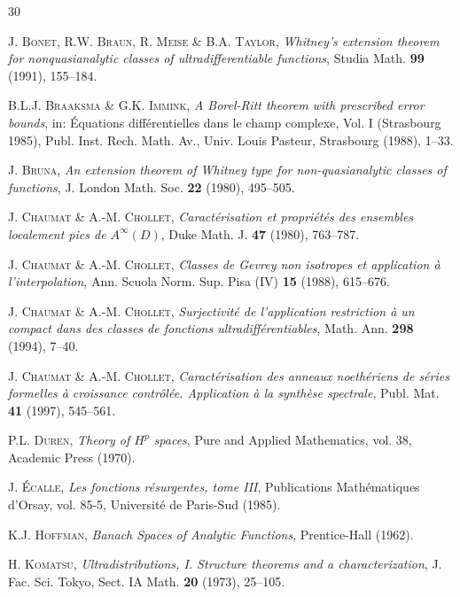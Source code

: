 \documentclass[a4paper]{amsart}
\theoremstyle{plain}
\theoremstyle{definition}
\theoremstyle{remark}
\begin{document}
\begin{thebibliography}{30}

 \textsc{J. Bonet, R.W. Braun, R. Meise \& B.A. Taylor}, \textit{Whitney's extension theorem for nonquasianalytic classes of ultradifferentiable functions}, Studia Math. \textbf{99} (1991), 155--184.

 \textsc{B.L.J. Braaksma \& G.K. Immink}, \textit{A Borel-Ritt theorem with prescribed error bounds}, in: \'Equations diff\'erentielles dans le champ complexe, Vol. I (Strasbourg 1985), Publ. Inst. Rech. Math. Av., Univ. Louis Pasteur, Strasbourg (1988), 1--33.

 \textsc{J. Bruna}, \textit{An extension theorem of Whitney type for non-quasianalytic classes of functions}, J. London Math. Soc. \textbf{22} (1980), 495--505.

 \textsc{J. Chaumat \& A.-M. Chollet}, \textit{Caract\'erisation et propri\'et\'es des ensembles localement pics de $ A^\infty(D) $}, Duke Math. J. \textbf{47} (1980), 763--787.

 \textsc{J. Chaumat \& A.-M. Chollet}, \textit{Classes de Gevrey non isotropes et application \`a l'interpolation}, Ann. Scuola Norm. Sup. Pisa (IV) \textbf{15} (1988), 615--676.

 \textsc{J. Chaumat \& A.-M. Chollet}, \textit{Surjectivit\'e de l'application restriction \`a un compact dans des classes de fonctions ultradiff\'erentiables}, Math. Ann. \textbf{298} (1994), 7--40.

 \textsc{J. Chaumat \& A.-M. Chollet}, \textit{Caract\'erisation des anneaux noeth\'eriens
de s\'eries formelles \`a croissance contr\^ol\'ee. Application \`a la synth\`ese
spectrale}, Publ. Mat. \textbf{41} (1997), 545--561.

 \textsc{P.L. Duren}, \textit{Theory of $ H^p $ spaces}, Pure and
Applied Mathematics, vol. 38, Academic Press (1970).

 \textsc{J. \'Ecalle}, \textit{Les fonctions r\'esurgentes, tome III},
Publications Math\'ematiques d'Orsay, vol. 85-5, Universit\'e de Paris-Sud (1985).

 \textsc{K.J. Hoffman}, \textit{Banach Spaces of Analytic Functions}, Prentice-Hall (1962).

 \textsc{H. Komatsu}, \textit{Ultradistributions, I. Structure theorems and a characterization}, J. Fac. Sci. Tokyo, Sect. IA Math. \textbf{20} (1973), 25--105.


\end{thebibliography}
\end{document}
